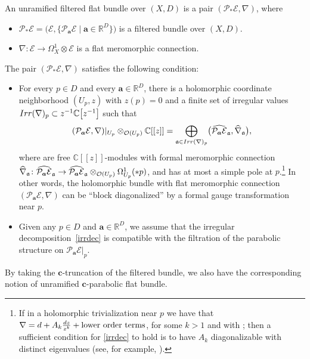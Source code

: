 \documentclass[11pt]{article}
\numberwithin{equation}{section}
\numberwithin{equation}{section}
\begin{document}
\begin{Definition} An unramified filtered flat bundle over $(X,D)$ is a pair $(\mathcal{P}_*\mathcal{E},\nabla)$, where
\begin{itemize}\itemsep=0pt
 \item $\mathcal{P}_*\mathcal{E}=\bigl(\mathcal{E},\bigl\{\mathcal{P}_{\boldsymbol{a}}\mathcal{E} \mid \boldsymbol{a} \in \mathbb{R}^{D}\bigr\}\bigr)$ is a filtered bundle over $(X,D)$.
 \item $\nabla\colon\mathcal{E}\to \Omega^1_X\otimes \mathcal{E}$ is a flat meromorphic connection.
\end{itemize}
The pair $(\mathcal{P}_*\mathcal{E},\nabla)$ satisfies the following condition:
\begin{itemize}\itemsep=0pt
 \item For every $p\in D$ and every $\boldsymbol{a}\in \mathbb{R}^{D}$, there is a holomorphic coordinate neighborhood $(U_p,z)$ with $z(p)=0$ and a finite set of irregular values $\textnormal{Irr}(\nabla)_p\subset z^{-1}\mathbb{C}\bigl[z^{-1}\bigr]$ such that
 \begin{equation}\label{irrdec}
 (\mathcal{P}_{\boldsymbol{a}}\mathcal{E},\nabla)|_{U_p}\otimes_{\mathcal{O}(U_p)}\mathbb{C}[[z]]=\bigoplus_{\mathfrak{a}\in \textnormal{Irr}(\nabla)_p}\bigl(\widehat{\mathcal{P}_{\boldsymbol{a}}\mathcal{E}}_{\mathfrak{a}},\widehat{\nabla}_{\mathfrak{a}}\bigr),
\end{equation}
where  are free $\mathbb{C}[[z]]$-modules with formal meromorphic connection $\smash{\widehat{\nabla}_{\mathfrak{a}}\colon \widehat{\mathcal{P}_{\boldsymbol{a}}\mathcal{E}}_{\mathfrak{a}}}\to \smash{\widehat{\mathcal{P}_{\boldsymbol{a}}\mathcal{E}}_{\mathfrak{a}} \otimes _{\mathcal{O}(U_p)} \Omega^1_{U_p}(* p)}$, and  has at most a simple pole at $p$.\footnote{If in a holomorphic trivialization near $p$ we have that $\nabla={\rm d} +A_k\frac{{\rm d}z}{z^k} + \text{lower order terms}$, for some $k>1$ and with ; then a sufficient condition for \eqref{irrdec} to hold is to have $A_k$ diagonalizable with distinct eigenvalues (see, for example, \cite[Lemma 1]{B2}).} In other words, the holomorphic bundle with flat meromorphic connection $(\mathcal{P}_{\boldsymbol{a}}\mathcal{E},\nabla)$ can be ``block diagonalized'' by a formal gauge transformation near $p$.
\item Given any $p\in D$ and $\boldsymbol{a}\in \mathbb{R}^D$, we assume that the irregular decomposition~\eqref{irrdec} is compatible with the filtration of the parabolic structure on $\mathcal{P}_{\boldsymbol{a}}\mathcal{E}|_p$.
\end{itemize}

By taking the $\boldsymbol{c}$-truncation of the filtered bundle, we also have the corresponding notion of unramified $\boldsymbol{c}$-parabolic flat bundle.
\end{Definition}
\end{document}
